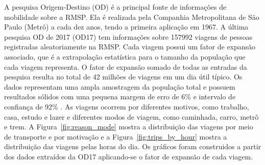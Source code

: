 A pesquisa Origem-Destino (OD) é a principal fonte de informações de mobilidade
sobre a RMSP. Ela é realizada pela Companhia Metropolitana de São Paulo (Metrô)
a cada dez anos, tendo a primeira aplicação em 1967. A última pesquisa OD de
2017 (OD17) tem informações sobre \num{157992} viagens de pessoas registradas
aleatoriamente na RMSP. Cada viagem possui um fator de expansão associado, que é
a extrapolação estatística para o tamanho da população que cada viagem
representa. O fator de expansão somado de todas as entradas da pesquisa resulta
no total de 42 milhões de viagens em um dia útil típico. Os dados representam
uma ampla amostragem da população total e possuem resultados sólidos com uma
pequena margem de erro de 6\% e intervalo de confiança de 92\%
\citep[p.18]{odmanual:17}. As viagens ocorrem por diferentes motivos, como
trabalho, casa, estudo e lazer e diferentes modos de viagem, como caminhada,
carro, metrô e trem. A Figura~\ref{fig:reason_mode} mostra a distribuição das
viagens por meio de transporte e por motivação e a
Figura~\ref{fig:trips_by_hour} mostra a distribuição das viagens pelas horas do
dia. Os gráficos foram construidos a partir dos dados extraídos da OD17
aplicando-se o fator de expansão de cada viagem.

